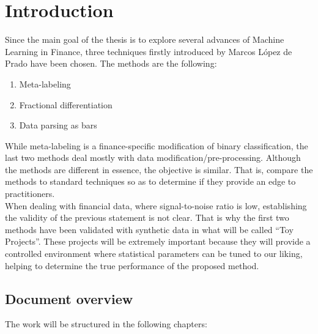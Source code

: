 \chapter{Introduction}

Since the main goal of the thesis is to explore several advances of Machine 
Learning in Finance, three techniques firstly introduced by Marcos López de 
Prado \cite{AdvFML} have been chosen. The methods are the following:

\begin{enumerate}
	\item Meta-labeling
	\item Fractional differentiation
	\item Data parsing as bars
\end{enumerate}

While meta-labeling is a finance-specific modification of binary 
classification, the last two methods deal mostly with data 
modification/pre-processing. Although the methods are different in essence, 
the objective is similar. That is, compare the methods to standard 
techniques so as to determine if they provide an edge to practitioners.\\

When dealing with financial data, where signal-to-noise ratio is low, 
establishing the validity of the previous statement is not clear. That is 
why the first two methods have been validated with synthetic data in what 
will be called ``Toy Projects''. These projects will be extremely important 
because they will provide a controlled environment where statistical 
parameters can be tuned to our liking, helping to determine the true 
performance of the proposed method.

\section{Document overview}
The work will be structured in the following chapters:

